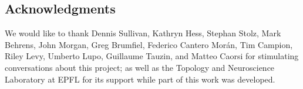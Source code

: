 
\subsection*{Acknowledgments} We would like to thank Dennis Sullivan, Kathryn Hess, Stephan Stolz, Mark Behrens, John Morgan, Greg Brumfiel, Federico Cantero Mor\'an, Tim Campion, Riley Levy, Umberto Lupo, Guillaume Tauzin, and Matteo Caorsi for stimulating conversations about this project; as well as the Topology and Neuroscience Laboratory at EPFL for its support while part of this work was developed.